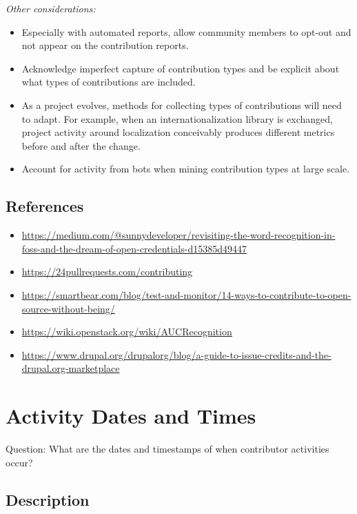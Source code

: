 \documentclass[
  12pt,
]{article}
\providecommand{\tightlist}{%
  \setlength{\itemsep}{0pt}\setlength{\parskip}{0pt}}
\begin{document}
\emph{Other considerations:}

\begin{itemize}
\tightlist
\item
  Especially with automated reports, allow community members to opt-out
  and not appear on the contribution reports.
\item
  Acknowledge imperfect capture of contribution types and be explicit
  about what types of contributions are included.
\item
  As a project evolves, methods for collecting types of contributions
  will need to adapt. For example, when an internationalization library
  is exchanged, project activity around localization conceivably
  produces different metrics before and after the change.
\item
  Account for activity from bots when mining contribution types at large
  scale.
\end{itemize}

\hypertarget{references-1}{%
\subsection{References}\label{references-1}}

\begin{itemize}
\tightlist
\item
  \url{https://medium.com/@sunnydeveloper/revisiting-the-word-recognition-in-foss-and-the-dream-of-open-credentials-d15385d49447}
\item
  \url{https://24pullrequests.com/contributing}
\item
  \url{https://smartbear.com/blog/test-and-monitor/14-ways-to-contribute-to-open-source-without-being/}
\item
  \url{https://wiki.openstack.org/wiki/AUCRecognition}
\item
  \url{https://www.drupal.org/drupalorg/blog/a-guide-to-issue-credits-and-the-drupal.org-marketplace}
\end{itemize}

\hypertarget{activity-dates-and-times}{%
\section{Activity Dates and Times}\label{activity-dates-and-times}}

Question: What are the dates and timestamps of when contributor
activities occur?

\hypertarget{description-2}{%
\subsection{Description}\label{description-2}}
\end{document}
